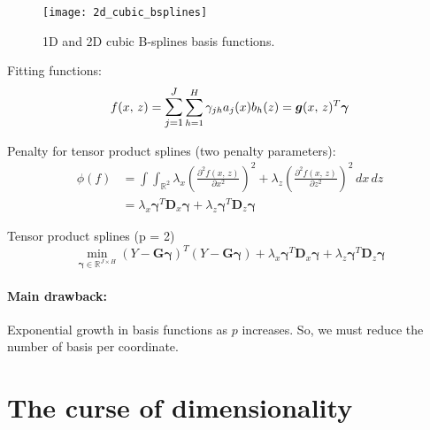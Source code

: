\begin{figure}[H]
    \texttt{[image: 2d\_cubic\_bsplines]}
    \caption{1D and 2D cubic B-splines basis functions.}
\end{figure}

Fitting functions:
\begin{equation*}
    f(x,\,z) = \mathlarger{\sum_{j=1}^J} \sum_{h=1}^H \gamma_{jh} a_j(x) b_h(z) = \boldsymbol g(x,\,z)^T \boldsymbol\gamma
\end{equation*}

Penalty for tensor product splines (two penalty parameters):
\begin{align*}
    \phi(f) &= \int \int_{\mathbb R^2}
    \lambda_x \left( \frac{\partial^2 f(x,\,z)}{\partial x^2} \right)^2
    + \lambda_z \left( \frac{\partial^2 f(x,\,z)}{\partial z^2} \right)^2
    \, dx \, dz \\
            &= \lambda_x \boldsymbol \gamma^T \boldsymbol D_x \boldsymbol \gamma
            + \lambda_z \boldsymbol \gamma^T \boldsymbol D_z \boldsymbol \gamma
\end{align*}

\begin{problem}{Tensor product splines (p = 2)}{}
    \begin{equation*}
        \min_{\boldsymbol \gamma \in \mathds R^{J \times H}}
        \left(
            Y - \boldsymbol G\boldsymbol \gamma
        \right)^T
        \left(
            Y - \boldsymbol G\boldsymbol \gamma
        \right)
        + \lambda_x \boldsymbol \gamma^T \boldsymbol D_x \boldsymbol \gamma
        + \lambda_z \boldsymbol \gamma^T \boldsymbol D_z \boldsymbol \gamma
    \end{equation*}
    \tcblower
    \begin{note}
        \paragraph{Main drawback:} Exponential growth in basis functions as $p$ increases.
        So, we must reduce the number of basis per coordinate.
    \end{note}
\end{problem}

\pagebreak
\section{The curse of dimensionality}

